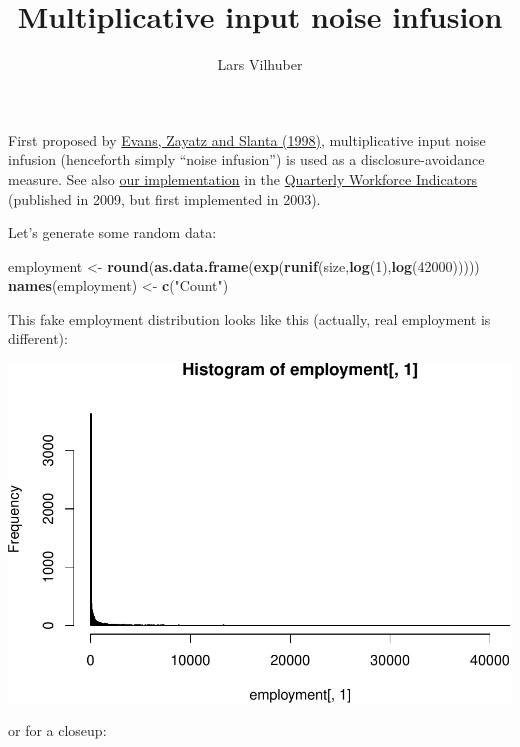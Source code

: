 \documentclass[]{article}
\title{Multiplicative input noise infusion}
\author{Lars Vilhuber}
\date{}
\newenvironment{Shaded}{\begin{snugshade}}{\end{snugshade}}
\newcommand{\KeywordTok}[1]{\textcolor[rgb]{0.13,0.29,0.53}{\textbf{{#1}}}}
\newcommand{\DecValTok}[1]{\textcolor[rgb]{0.00,0.00,0.81}{{#1}}}
\newcommand{\StringTok}[1]{\textcolor[rgb]{0.31,0.60,0.02}{{#1}}}
\newcommand{\NormalTok}[1]{{#1}}
\begin{document}
\maketitle


First proposed by
\href{http://www.jos.nu/Articles/abstract.asp?article=144537}{Evans,
Zayatz and Slanta (1998)}, multiplicative input noise infusion
(henceforth simply ``noise infusion'') is used as a disclosure-avoidance
measure. See also
\href{https://ideas.repec.org/h/nbr/nberch/0485.html}{our
implementation} in the \href{http://lehd.ces.census.gov/data}{Quarterly
Workforce Indicators} (published in 2009, but first implemented in
2003).

Let's generate some random data:

\begin{Shaded}
\begin{Highlighting}[]
\NormalTok{employment <-}\StringTok{ }\KeywordTok{round}\NormalTok{(}\KeywordTok{as.data.frame}\NormalTok{(}\KeywordTok{exp}\NormalTok{(}\KeywordTok{runif}\NormalTok{(size,}\KeywordTok{log}\NormalTok{(}\DecValTok{1}\NormalTok{),}\KeywordTok{log}\NormalTok{(}\DecValTok{42000}\NormalTok{)))))}
\KeywordTok{names}\NormalTok{(employment) <-}\StringTok{ }\KeywordTok{c}\NormalTok{(}\StringTok{"Count"}\NormalTok{)}
\end{Highlighting}
\end{Shaded}

This fake employment distribution looks like this (actually, real
employment is different):

\includegraphics{rampdist_files/figure-latex/unnamed-chunk-3-1.pdf}

or for a closeup:
\end{document}
